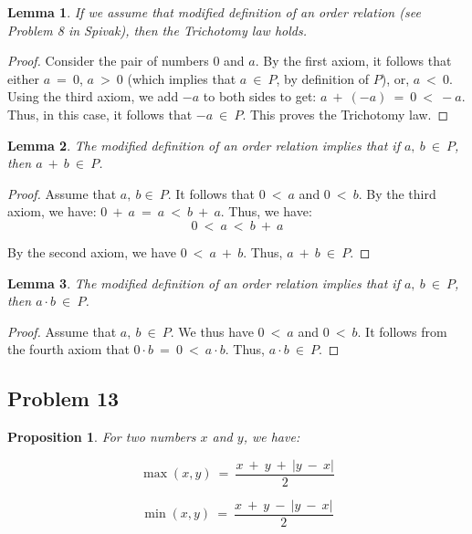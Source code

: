 \documentclass[10pt, oneside]{article}
\newtheorem{lem}{Lemma}
\newtheorem{prop}{Proposition}
\begin{document}
\begin{lem}
  If we assume that modified definition of an order relation (see Problem 8 in Spivak), then the Trichotomy law holds.
\end{lem}

\begin{proof}
  Consider the pair of numbers $0$ and $a$. By the first axiom, it follows that either $a \ = \ 0$, $a \ > \ 0$ (which implies that $a \ \in \ P$, by definition of $P$), or,
  $a \ < \ 0$. Using the third axiom, we add $-a$ to both sides to get: $a \ + \ (-a) \ = \ 0 \ < \ -a$. Thus, in this case, it follows that $-a \ \in \ P$. This proves the Trichotomy law.
\end{proof}

\begin{lem}
  The modified definition of an order relation implies that if $a, \ b \ \in \ P$, then $a \ + \ b \ \in \ P$.
\end{lem}

\begin{proof}
  Assume that $a, \ b \in \ P$. It follows that $0 \ < \ a$ and $0 \ < \ b$. By the third axiom, we have: $0 \ + \ a \ = \ a \ < \ b \ + \ a$. Thus, we have:
  \newpage
  $$0 \ < \ a \ < \ b \ + \ a$$

  By the second axiom, we have $0 \ < \ a \ + \ b$. Thus, $a \ + \ b \ \in \ P$.
\end{proof}

\begin{lem}
  The modified definition of an order relation implies that if $a, \ b \ \in \ P$, then $a \cdot b \ \in \ P$.
\end{lem}

\begin{proof}
  Assume that $a, \ b \ \in \ P$. We thus have $0 \ < \ a$ and $0 \ < \ b$. It follows from the fourth axiom that $0 \cdot b \ = \ 0 \ < \ a \cdot b$. Thus,
  $a \cdot b \ \in \ P$.
\end{proof}

\subsection{Problem 13}

\begin{prop}
  For two numbers $x$ and $y$, we have:

  $$\max (x,  y) \ = \ \frac{x \ + \ y \ + \ |y \ - \ x|}{2}$$

  $$\min (x,  y) \ = \ \frac{x \ + \ y \ - \ |y \ - \ x|}{2}$$
  \end{prop}
\end{document}
